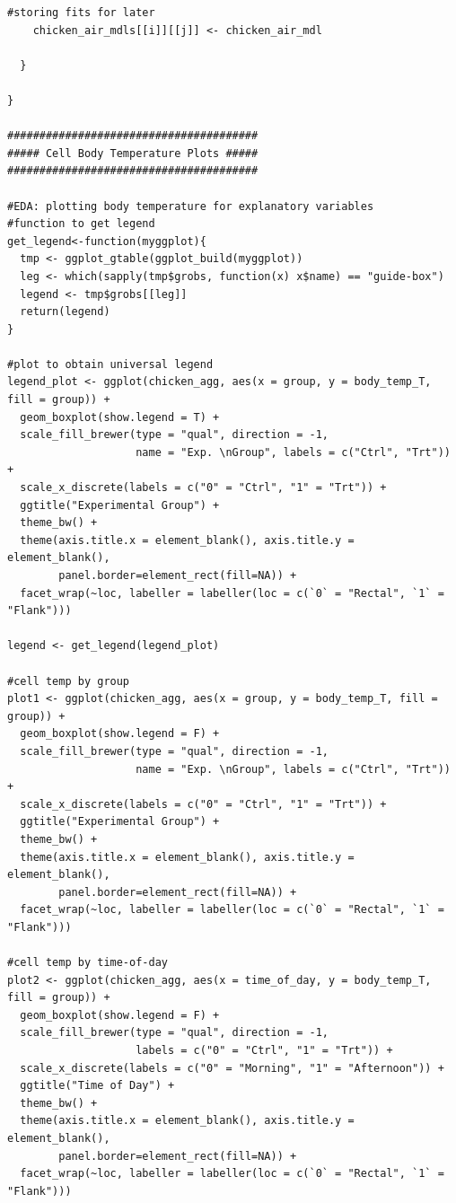 \documentclass[a4paper, 10pt, titlepage]{article}
\begin{document}
\begin{lstlisting}[basicstyle = \footnotesize \ttfamily]
    #storing fits for later
    chicken_air_mdls[[i]][[j]] <- chicken_air_mdl
    
  }
  
}

#######################################
##### Cell Body Temperature Plots #####
#######################################

#EDA: plotting body temperature for explanatory variables
#function to get legend
get_legend<-function(myggplot){
  tmp <- ggplot_gtable(ggplot_build(myggplot))
  leg <- which(sapply(tmp$grobs, function(x) x$name) == "guide-box")
  legend <- tmp$grobs[[leg]]
  return(legend)
}

#plot to obtain universal legend
legend_plot <- ggplot(chicken_agg, aes(x = group, y = body_temp_T, fill = group)) +
  geom_boxplot(show.legend = T) +
  scale_fill_brewer(type = "qual", direction = -1, 
                    name = "Exp. \nGroup", labels = c("Ctrl", "Trt")) +
  scale_x_discrete(labels = c("0" = "Ctrl", "1" = "Trt")) +
  ggtitle("Experimental Group") + 
  theme_bw() +
  theme(axis.title.x = element_blank(), axis.title.y = element_blank(),
        panel.border=element_rect(fill=NA)) +
  facet_wrap(~loc, labeller = labeller(loc = c(`0` = "Rectal", `1` = "Flank")))

legend <- get_legend(legend_plot)

#cell temp by group
plot1 <- ggplot(chicken_agg, aes(x = group, y = body_temp_T, fill = group)) +
  geom_boxplot(show.legend = F) +
  scale_fill_brewer(type = "qual", direction = -1,
                    name = "Exp. \nGroup", labels = c("Ctrl", "Trt")) +
  scale_x_discrete(labels = c("0" = "Ctrl", "1" = "Trt")) +
  ggtitle("Experimental Group") + 
  theme_bw() +
  theme(axis.title.x = element_blank(), axis.title.y = element_blank(),
        panel.border=element_rect(fill=NA)) +
  facet_wrap(~loc, labeller = labeller(loc = c(`0` = "Rectal", `1` = "Flank")))

#cell temp by time-of-day
plot2 <- ggplot(chicken_agg, aes(x = time_of_day, y = body_temp_T, fill = group)) +
  geom_boxplot(show.legend = F) +
  scale_fill_brewer(type = "qual", direction = -1,
                    labels = c("0" = "Ctrl", "1" = "Trt")) +
  scale_x_discrete(labels = c("0" = "Morning", "1" = "Afternoon")) +
  ggtitle("Time of Day") + 
  theme_bw() +
  theme(axis.title.x = element_blank(), axis.title.y = element_blank(),
        panel.border=element_rect(fill=NA)) +
  facet_wrap(~loc, labeller = labeller(loc = c(`0` = "Rectal", `1` = "Flank")))


\end{lstlisting}
\end{document}
